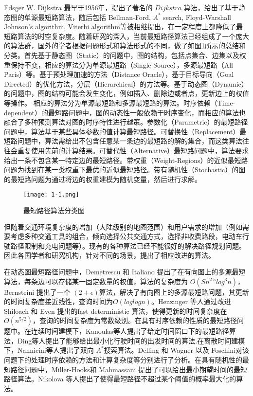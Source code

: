 \documentclass{standalone}
\begin{document}
Edsger W. Dijkstra 最早于1956年，提出了著名的 $Dijkstra$ 算法，给出了基于静态图的单源最短路算法，随后包括 Bellman-Ford, $A^*$ search, Floyd-Warshall Johnson's algorithm, Viterbi algorithm等被相继提出，在一定程度上都降低了最短路算法的时空复杂度。随着研究的深入，当前最短路径算法已经组成了一个庞大的算法群，国外的学者根据问题形式和算法形式的不同，做了如图\ref{1-1}所示的总结和分类。首先基于静态图（Static）的问题中，图的结构，包括点集合、边集以及权重保持不变，相应的算法分为单源最短路（Single Source），多源最短路（All Paris）等。基于预处理加速的方法（Distance Oracle），基于目标导向（Goal Directed）的优化方法，分层（Hierarchical）的方法等。基于动态图（Dynamic）的问题中，图的结构可能会发生变化，例如插入、删除边或者点，更新边上的权值等操作。 相应的算法分为单源最短路和多源最短路的算法。时序依赖（Time-dependent）的最短路问题中，图的动态性一般依赖于时序变化，而相应的算法也融合了多种预测算法对图的时序特性进行越策。参数化（Parametric）的最短路径问题中，算法基于某些具体参数的值计算最短路径。可替换性（Replacement）最短路问题中，算法需给出不包含任意某一条边的最短路的解的集合，而这类算法往往会重复使用先前的计算结果。可替代性（Alternative）最短路问题中，算法要求给出一条不包含某一特定边的最短路径。带权重（Weight-Regions）的近似最短路问题为找到在某一类权重下最优的近似最短路径。带有随机性（Stochastic）的图的最短路问题为通过将边的权重建模为随机变量，然后进行求解。\par
\begin{figure}[H]
	\texttt{[image: 1-1.png]}
	\caption{最短路径算法分类图}
	\label{1-1}
\end{figure}

但随着交通环境复杂度的增加（大陆级别的地图范围）和用户需求的增加（例如需要考虑多种交通工具的组合，倾向选择公共交通方式，选择非收费路段，电动车行驶路径限制和充电问题等）。现有的各种算法已经不能很好的解决路径规划问题。因此各国学者和研究机构，针对不同的场景，提出了相应改进的算法。\par

在动态图最短路径问题中，Demetrescu 和 Italiano 提出了在有向图上的多源最短算法，每条边可以存储某一固定数量的权值，算法的复杂度为 $O(Sn^{2.5}log^3n)$，Bernsteini 提出了一个 $(2+\epsilon)$算法，解决了有向图上的多源最短路问题，其更新的时间复杂度接近线性，查询时间为$O(loglogn)$。Henzinger 等人通过改进 Shiloach 和 Even 提出的fast deterministic 算法，使得更新的时间复杂度在$O(n^{5/2})$，查询的时间复杂度为常数级别。在具有时序依赖的性质的最短路径问题中。在连续时间建模下，Kanoulas等人提出了给定时间窗口下的最短路径算法，Ding等人提出了能够给出最小化行驶时间的出发时间的算法.在离散时间建模下，Nannicini等人提出了双向 $A^*$搜索算法。Delling 和 Wagner 以及 Foschini对该问题下的处理时序依赖的方法和计算复杂度等分别进行了分析。在具有随机性的最短路径问题中，Miller-Hooks和 Mahmassani 提出了可以给出最小期望时间的最短路径算法。Nikolova 等人提出了使得最短路径不超过某个阈值的概率最大化的算法。
\end{document}
